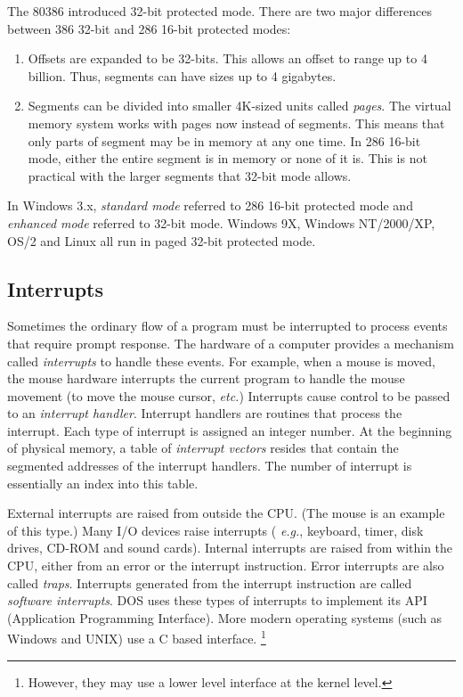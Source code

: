 The 80386 introduced 32-bit protected mode. There are two major differences
between 386 32-bit and 286 16-bit protected modes:
\begin{enumerate}
\item

Offsets are expanded to be 32-bits. This allows an offset to range up
to 4 billion. Thus, segments can have sizes up to 4 gigabytes.

\item

Segments can be divided into smaller 4K-sized
units called \emph{pages}. The virtual
memory system works with pages now instead of
segments. This means that only parts of segment may be in memory at
any one time. In 286 16-bit mode, either the entire segment is in
memory or none of it is. This is not practical with the larger
segments that 32-bit mode allows.

\end{enumerate}


In Windows 3.x, \emph{standard mode} referred to 286 16-bit protected mode and
\emph{enhanced mode} referred to 32-bit mode. Windows 9X, Windows NT/2000/XP, OS/2
and Linux all run in paged 32-bit protected mode.

\subsection{Interrupts}

Sometimes the ordinary flow of a program must be interrupted to process events
that require prompt response. The hardware of a computer provides a mechanism
called \emph{interrupts} to handle these events. For example, when a mouse is
moved, the mouse hardware interrupts the current program to handle the mouse
movement (to move the mouse cursor, {\em etc.\/}) Interrupts cause control to
be passed to an \emph{interrupt handler}. Interrupt handlers are routines that
process the interrupt. Each type of interrupt is assigned an integer number.
At the beginning of physical memory, a table of \emph{interrupt vectors}
resides that contain the segmented addresses of the interrupt handlers. The
number of interrupt is essentially an index into this table.

External interrupts are raised from outside the CPU. (The mouse is an
example of this type.) Many I/O devices raise interrupts ({\em
e.g.\/}, keyboard, timer, disk drives, CD-ROM and sound
cards). Internal interrupts are raised from within the CPU, either
from an error or the interrupt instruction. Error interrupts are also
called \emph{traps}. Interrupts generated from the interrupt
instruction are called \emph{software interrupts}. DOS uses these types of
interrupts to implement its API (Application Programming Interface). More
modern operating systems (such as Windows and UNIX) use a C based interface.
\footnote{However, they may use a lower level interface at the kernel level.}

